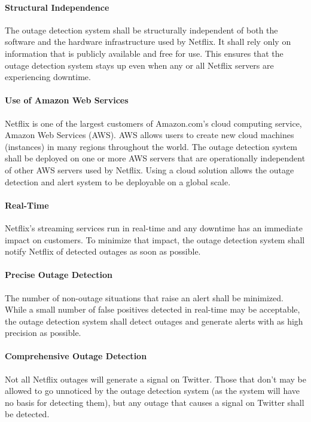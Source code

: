 \documentclass[12pt]{ucthesis}
\begin{document}
\paragraph{Structural Independence}
The outage detection system shall be structurally independent of both the
software and the hardware infrastructure used by Netflix. It shall rely only on
information that is publicly available and free for use. This ensures that the
outage detection system stays up even when any or all Netflix servers are
experiencing downtime.

\paragraph{Use of Amazon Web Services}
Netflix is one of the largest customers of Amazon.com's cloud computing
service, Amazon Web Services (AWS). AWS allows users to create new cloud
machines (instances) in many regions throughout the world. The outage
detection system shall be deployed on one or more AWS servers that are
operationally independent of other AWS servers used by Netflix. Using a cloud
solution allows the outage detection and alert system to be deployable on a
global scale.

\paragraph{Real-Time}
Netflix's streaming services run in real-time and any downtime has an immediate
impact on customers. To minimize that impact, the outage detection system shall notify
Netflix of detected outages as soon as possible.

\paragraph{Precise Outage Detection}
The number of non-outage situations that raise an alert shall be minimized.
While a small number of false positives detected in real-time may be acceptable,
the outage detection system shall detect outages and generate alerts with as
high precision as possible.

\paragraph{Comprehensive Outage Detection}
Not all Netflix outages will generate a signal on Twitter. Those that don't may
be allowed to go unnoticed by the outage detection system (as the system will
have no basis for detecting them), but any outage that causes a signal on
Twitter shall be detected.
\end{document}
